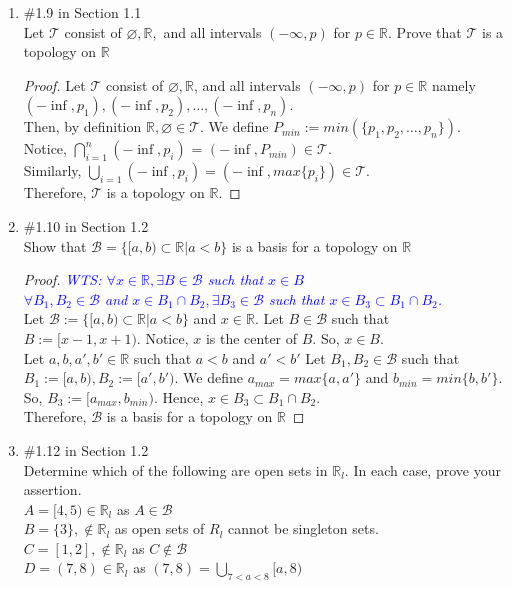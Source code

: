 \documentclass[12pt]{article}
\newcommand{\R}{\mathbb{R}}
\newcommand{\BB}{\mathcal{B}}
\newcommand{\TT}{\mathcal{T}}
\newcommand{\wts}[1]{\textit{\textcolor{blue}{WTS: #1}}\\}
\begin{document}
\begin{enumerate}
\begin{proof}
\end{proof}
\item \#1.9 in Section 1.1\\
Let $\mathcal{T}$ consist of $\varnothing, \mathbb{R},$ and all intervals $(-\infty, p)$ for $p \in \mathbb{R} .$ Prove that $\mathcal{T}$ is a topology on $\mathbb{R}$\\
\begin{proof}
	Let $ \TT $ consist of $ \varnothing, \R $, and all intervals $ (-\infty, p) $ for $ p\in \R $ namely $ (-\inf,p_1), (-\inf,p_2),\ldots, (-\inf,p_n) $.\\
	Then, by definition $ \R, \varnothing\in\TT $. We define $ P_{min}:= min(\{p_1,p_2,\ldots, p_n\})$. Notice, $ \bigcap_{i=1}^n (-\inf,p_i)$ = $ (-\inf, P_{min})\in\TT $.\\
	Similarly, $ \bigcup_{i=1} (-\inf,p_i) = (-\inf, max\{p_i\}) \in \TT $. \\
	Therefore, $ \TT $ is a topology on $ \R $. 
\end{proof}
\item \#1.10 in Section 1.2\\
Show that $\mathcal{B}=\{[a, b) \subset \mathbb{R} | a<b\}$ is a basis for a topology on $\mathbb{R}$
\begin{proof}
	\wts{$ \forall x\in \R, \exists B\in\BB $ such that $ x\in B $\\
		$ \forall B_1, B_2\in\BB $ and $ x\in B_1\cap B_2, \exists B_3 \in \BB$	such that $ x\in B_3 \subset B_1\cap B_2 $.	
	}
	Let $ \BB := \{[a, b) \subset \mathbb{R} | a<b\} $ and $ x \in \R $. Let $ B\in \BB $ such that $ B:=[x-1,x+1) $. Notice, $ x $ is the center of $ B $. So, $ x\in B $.\\
	Let  $a,b,a',b' \in \R $ such that $ a<b $ and $ a'<b' $ Let $ B_1,B_2\in\BB $ such that $ B_1:=[a,b), B_2:=[a',b')$. We define $ a_{max}=max\{a,a'\} $ and $ b_{min}=min\{b,b'\}.$ So, $ B_3:=[a_{max},b_{min})$. Hence, $ x\in B_3\subset B_1\cap B_2 $.\\
	Therefore, $ \BB $ is a basis for a topology on $ \R $
\end{proof}
\item \#1.12 in Section 1.2\\
Determine which of the following are open sets in $\mathbb{R}_{l} .$ In each case, prove your assertion.\\
$A=[4,5) \in \R_l $ as  $A\in \BB$ \\
$B=\{3\},\not\in\R_l $ as open sets of $ R_l $ cannot be singleton sets.\\
$C=[1,2], \not\in\R_l $ as $ C\not\in\BB $\\
$D=(7,8) \in \R_l$ as $ (7,8)=\bigcup_{7<a<8} [a,8) $ 



\end{enumerate}
\end{document}
